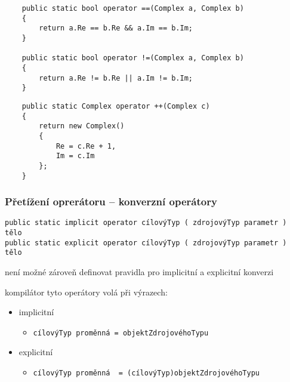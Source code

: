 \begin{frame}[fragile]
\begin{yesblock}
\begin{lstlisting}
    public static bool operator ==(Complex a, Complex b)
    {
        return a.Re == b.Re && a.Im == b.Im;
    }

    public static bool operator !=(Complex a, Complex b)
    {
        return a.Re != b.Re || a.Im != b.Im;
    }
\end{lstlisting}
\end{yesblock}
\end{frame}




\begin{frame}[fragile]
\begin{yesblock}
\begin{lstlisting}
    public static Complex operator ++(Complex c)
    {
        return new Complex()
        {
            Re = c.Re + 1,
            Im = c.Im
        };
    }
\end{lstlisting}
\end{yesblock}
\end{frame}




\begin{frame}[fragile]
\frametitle{Přetížení oprerátoru -- konverzní operátory}
\vfill
\begin{noteblock}{}
\begin{lstlisting}
public static implicit operator cílovýTyp ( zdrojovýTyp parametr ) tělo
public static explicit operator cílovýTyp ( zdrojovýTyp parametr ) tělo
\end{lstlisting}
\end{noteblock}
\vfill
\begin{bitemize}{}
\item není možné zároveň definovat pravidla pro implicitní a explicitní konverzi
\item kompilátor tyto operátory volá při výrazech:
\begin{itemize}
\item implicitní
\begin{itemize}
\item \lstinline|cílovýTyp proměnná = objektZdrojovéhoTypu|
\end{itemize}

\item explicitní
\begin{itemize}
\item \lstinline|cílovýTyp proměnná  = (cílovýTyp)objektZdrojovéhoTypu|
\end{itemize}
\end{itemize}

\end{bitemize}
\vfill
\end{frame}




